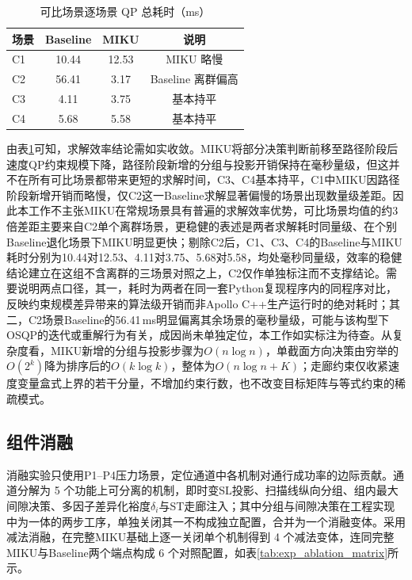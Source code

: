 \documentclass[a4paper,zihao=5]{ctexart}
\theoremstyle{definition}
\begin{document}
\begin{table}[htbp]
\centering
\caption{可比场景逐场景 QP 总耗时（ms）}
\label{tab:exp_qp_percomp}
\small
\begin{tabular}{lccc}
\toprule
\textbf{场景} & \textbf{Baseline} & \textbf{MIKU} & \textbf{说明} \\
\midrule
C1 & 10.44 & 12.53 & MIKU 略慢 \\
C2 & 56.41 & 3.17 & Baseline 离群偏高 \\
C3 & 4.11 & 3.75 & 基本持平 \\
C4 & 5.68 & 5.58 & 基本持平 \\
\bottomrule
\end{tabular}
\end{table}

由表\ref{tab:exp_qp_percomp}可知，求解效率结论需如实收敛。MIKU将部分决策判断前移至路径阶段后速度QP约束规模下降，路径阶段新增的分组与投影开销保持在毫秒量级，但这并不在所有可比场景都带来更短的求解时间，C3、C4基本持平，C1中MIKU因路径阶段新增开销而略慢，仅C2这一Baseline求解显著偏慢的场景出现数量级差距。因此本工作不主张MIKU在常规场景具有普遍的求解效率优势，可比场景均值的约3倍差距主要来自C2单个离群场景，更稳健的表述是两者求解耗时同量级、在个别Baseline退化场景下MIKU明显更快；剔除C2后，C1、C3、C4的Baseline与MIKU耗时分别为10.44对12.53、4.11对3.75、5.68对5.58，均处毫秒同量级，效率的稳健结论建立在这组不含离群的三场景对照之上，C2仅作单独标注而不支撑结论。需要说明两点口径，其一，耗时为两者在同一套Python复现程序内的同程序对比，反映约束规模差异带来的算法级开销而非Apollo C++生产运行时的绝对耗时；其二，C2场景Baseline的56.41\,ms明显偏离其余场景的毫秒量级，可能与该构型下OSQP的迭代或重解行为有关，成因尚未单独定位，本工作如实标注为待查。从复杂度看，MIKU新增的分组与投影步骤为$O(n \log n)$，单截面方向决策由穷举的$O(2^k)$降为排序后的$O(k \log k)$，整体为$O(n \log n + K)$；走廊约束仅收紧速度变量盒式上界的若干分量，不增加约束行数，也不改变目标矩阵与等式约束的稀疏模式。

\subsection{组件消融}
\label{subsec:exp_ablation}

消融实验只使用P1--P4压力场景，定位通道中各机制对通行成功率的边际贡献。通道分解为 5 个功能上可分离的机制，即时变SL投影、扫描线纵向分组、组内最大间隙决策、多因子差异化裕度$\delta_i$与ST走廊注入；其中分组与间隙决策在工程实现中为一体的两步工序，单独关闭其一不构成独立配置，合并为一个消融变体。采用减法消融，在完整MIKU基础上逐一关闭单个机制得到 4 个减法变体，连同完整MIKU与Baseline两个端点构成 6 个对照配置，如表\ref{tab:exp_ablation_matrix}所示。
\end{document}
